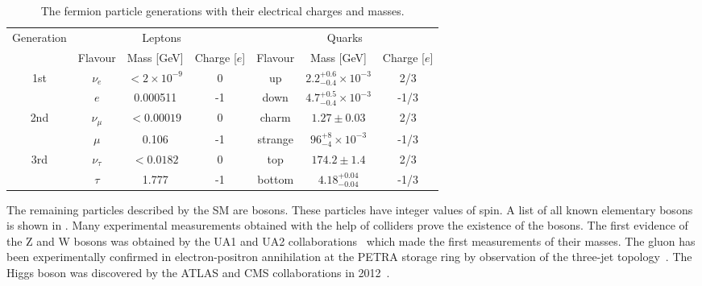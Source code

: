 \begin{table*}[!ht]
\begin{center}
\begin{tabular}{c||c|c|c||c|c|c}
\multirow{2}{*}{Generation} & \multicolumn{3}{c||}{Leptons} & \multicolumn{3}{c}{Quarks} \\
\cline{2-7}
 & Flavour & Mass [GeV] & Charge [$e$] &  Flavour & Mass [GeV] & Charge [$e$] \\
\hline
\multirow{2}{*}{1st} & $\nu_e$ & $<2\times10^{-9}$ & 0 & up & $2.2^{+0.6}_{-0.4}\times10^{-3}$ & 2/3 \\
 & $e$ & 0.000511 & -1 & down & $4.7^{+0.5}_{-0.4}\times10^{-3}$ & -1/3 \\
\cline{1-7} 
\multirow{2}{*}{2nd} & $\nu_{\mu}$ & $<0.00019$ & 0 & charm & $1.27\pm0.03$ & 2/3 \\
 & $\mu$ & 0.106 & -1 & strange & $96^{+8}_{-4}\times10^{-3}$ & -1/3 \\
\cline{1-7}
\multirow{2}{*}{3rd} & $\nu_{\tau}$ & $<0.0182$ & 0 & top & $174.2\pm1.4$ & 2/3 \\
 & $\tau$ & 1.777 & -1 & bottom & $4.18^{+0.04}_{-0.04}$ & -1/3 \\
\end{tabular}
\end{center}
 \caption{The fermion particle generations with their electrical charges and masses.}
\label{tab:fermions}
\end{table*}

The remaining particles described by the SM are bosons. These particles have integer values of spin.
A list of all known elementary bosons is shown in .
Many experimental measurements obtained with the help of colliders prove the existence of the bosons.
The first evidence of the Z and W bosons was obtained by the UA1 and UA2 collaborations~\cite{ARNISON1983103, BAGNAIA1983130}
which made the first measurements of their masses.
The gluon has been experimentally confirmed 
in electron-positron annihilation at the PETRA storage ring by observation
of the three-jet topology~\cite{three_jet_event}.
The Higgs boson was discovered by the ATLAS and CMS collaborations in 2012~\cite{Aad2012tfa, Chatrchyan2012ufa}.

